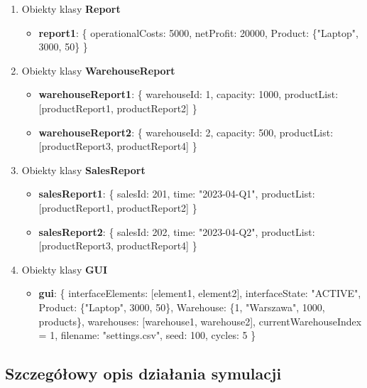 \documentclass[11pt]{article}
\begin{document}
\begin{enumerate}
\item Obiekty klasy \textbf{Report}
\begin{itemize}
    \item \textbf{report1}: \{ operationalCosts: 5000, netProfit: 20000, Product: \{"Laptop", 3000, 50\} \}
\end{itemize}

\item Obiekty klasy \textbf{WarehouseReport}
\begin{itemize}
    \item \textbf{warehouseReport1}: \{ warehouseId: 1, capacity: 1000, productList: [productReport1, productReport2] \}
    \item \textbf{warehouseReport2}: \{ warehouseId: 2, capacity: 500, productList: [productReport3, productReport4] \}
\end{itemize}

\item Obiekty klasy \textbf{SalesReport}
\begin{itemize}
    \item \textbf{salesReport1}: \{ salesId: 201, time: "2023-04-Q1", productList: [productReport1, productReport2] \}
    \item \textbf{salesReport2}: \{ salesId: 202, time: "2023-04-Q2", productList: [productReport3, productReport4] \}
\end{itemize}

\item Obiekty klasy \textbf{GUI}
\begin{itemize}
    \item \textbf{gui}: \{ interfaceElements: [element1, element2], interfaceState: "ACTIVE", Product: \{"Laptop", 3000, 50\}, Warehouse: \{1, "Warszawa", 1000, products\}, warehouses: [warehouse1, warehouse2], currentWarehouseIndex = 1, filename: "settings.csv", seed: 100, cycles: 5 \}
\end{itemize}
    
\end{enumerate}

\subsection{Szczegółowy opis działania symulacji}
\end{document}
